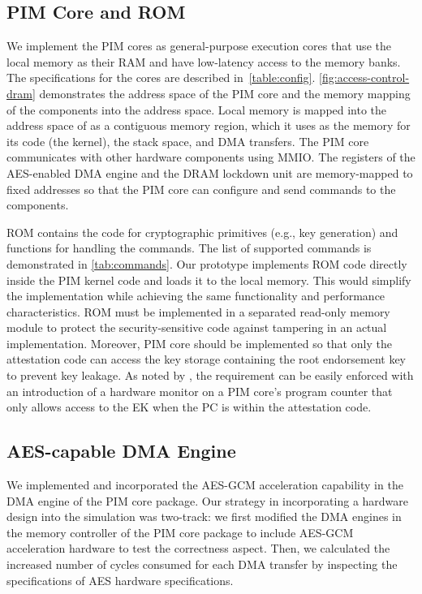 \subsection{PIM Core and ROM}
We implement the PIM cores as general-purpose execution cores that use the local memory as their RAM and have low-latency access to the memory banks. The specifications for the cores are described in~\autoref{table:config}. \autoref{fig:access-control-dram} demonstrates the address space of the PIM core and the memory mapping of the components into the address space. Local memory is mapped into the address space of \thename as a contiguous memory region, which it uses as the memory for its code (the \thename kernel), the stack space, and DMA transfers. The PIM core communicates with other hardware components using MMIO. The registers of the AES-enabled DMA engine and the DRAM lockdown unit are memory-mapped to fixed addresses so that the PIM core can configure and send commands to the components.

ROM contains the code for cryptographic primitives (e.g., key generation) and functions for handling the commands. The list of supported commands is demonstrated in \autoref{tab:commands}. Our prototype implements ROM code directly inside the PIM kernel code and loads it to the local memory. This would simplify the implementation while achieving the same functionality and performance characteristics. ROM must be implemented in a separated read-only memory module to protect the security-sensitive code against tampering in an actual implementation. Moreover, PIM core should be implemented so that only the attestation code can access the key storage containing the root endorsement key to prevent key leakage. As noted by \cite{minimalist}, the requirement can be easily enforced with an introduction of a hardware monitor on a PIM core's program counter that only allows access to the EK when the PC is within the attestation code.


\subsection{AES-capable DMA Engine}
\label{subsec:impl-aes}
We implemented and incorporated the AES-GCM acceleration capability in the DMA engine of the PIM core package. Our strategy in incorporating a hardware design into the simulation was two-track: we first modified the DMA engines in the memory controller of the PIM core package to include AES-GCM acceleration hardware to test the correctness aspect. Then, we calculated the increased number of cycles consumed for each DMA transfer by inspecting the specifications of AES hardware specifications.


